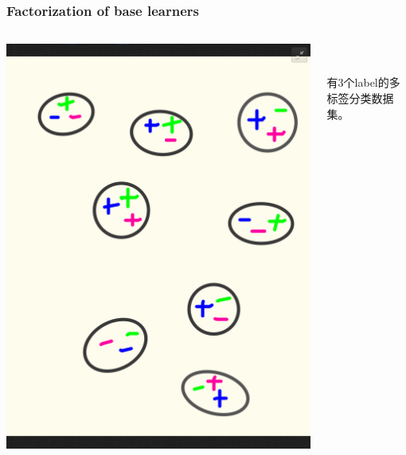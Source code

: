\documentclass{beamer}
\begin{document}
\begin{frame}
\frametitle{Factorization of base learners}
\begin{columns}[T]
  \begin{column}{.55\textwidth}
    \includegraphics[width=\textwidth]{img/gbc_1.png}
  \end{column}
  \begin{column}{.45\textwidth}
    \ \\ \ \\
    有3个label的多标签分类数据集。
  \end{column}
\end{columns}
\end{frame}
\end{document}
